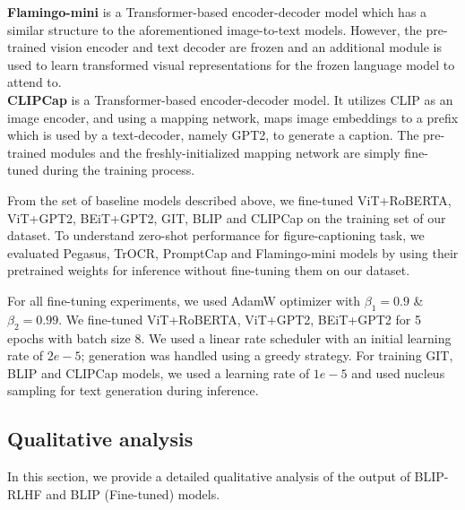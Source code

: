 \documentclass[11pt]{article}
\renewcommand{\cite}[1]{\citep{#1}}
\begin{document}
\textbf{Flamingo-mini} \cite{alayrac2022flamingo} is a Transformer-based encoder-decoder model which has a similar structure to the aforementioned image-to-text models. However, the pre-trained vision encoder and text decoder are frozen and an additional module is used to learn transformed visual representations for the frozen language model to attend to. 
\\
\textbf{CLIPCap} \cite{mokady2021clipcap} is a Transformer-based encoder-decoder model. It utilizes CLIP as an image encoder, and using a mapping network, maps image embeddings to a prefix which is used by a text-decoder, namely GPT2, to generate a caption. The pre-trained modules and the freshly-initialized mapping network are simply fine-tuned during the training process. 

From the set of baseline models described above, we fine-tuned ViT+RoBERTA, ViT+GPT2, BEiT+GPT2, GIT, BLIP and CLIPCap on the training set of our dataset. To understand zero-shot performance for figure-captioning task, we evaluated Pegasus, TrOCR, PromptCap and Flamingo-mini models by using their pretrained weights for inference without fine-tuning them on our dataset. 

For all fine-tuning experiments, we used AdamW  optimizer with $\beta_1 = 0.9$ \& $\beta_2 = 0.99$. We fine-tuned ViT+RoBERTA, ViT+GPT2, BEiT+GPT2 for 5 epochs with batch size 8. We used a linear rate scheduler with an initial learning rate of $2e-5$; generation was handled using a greedy strategy. For training GIT, BLIP and CLIPCap models, we used a learning rate of $1e-5$ and used nucleus sampling for text generation during inference.

\subsection{ Qualitative analysis}

In this section, we provide a detailed qualitative analysis of the output of BLIP-RLHF and BLIP (Fine-tuned) models.
\end{document}
